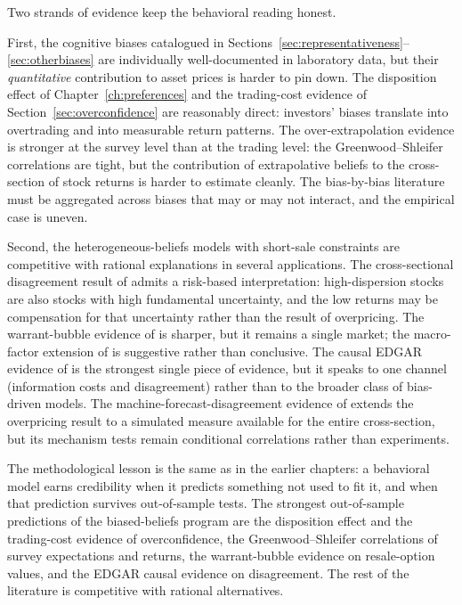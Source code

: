 Two strands of evidence keep the behavioral reading honest.

First, the cognitive biases catalogued in Sections~\ref{sec:representativeness}--\ref{sec:otherbiases} are individually well-documented in laboratory data, but their \emph{quantitative} contribution to asset prices is harder to pin down. The disposition effect of Chapter~\ref{ch:preferences} and the trading-cost evidence of Section~\ref{sec:overconfidence} are reasonably direct: investors' biases translate into overtrading and into measurable return patterns. The over-extrapolation evidence is stronger at the survey level than at the trading level: the Greenwood--Shleifer correlations are tight, but the contribution of extrapolative beliefs to the cross-section of stock returns is harder to estimate cleanly. The bias-by-bias literature must be aggregated across biases that may or may not interact, and the empirical case is uneven.

Second, the heterogeneous-beliefs models with short-sale constraints are competitive with rational explanations in several applications. The cross-sectional disagreement result of \citet{diether2003} admits a risk-based interpretation: high-dispersion stocks are also stocks with high fundamental uncertainty, and the low returns may be compensation for that uncertainty rather than the result of overpricing. The warrant-bubble evidence of \citet{xiong2011} is sharper, but it remains a single market; the macro-factor extension of \citet{li2016} is suggestive rather than conclusive. The causal EDGAR evidence of \citet{chang2022} is the strongest single piece of evidence, but it speaks to one channel (information costs and disagreement) rather than to the broader class of bias-driven models. The machine-forecast-disagreement evidence of \citet{bali2026} extends the overpricing result to a simulated measure available for the entire cross-section, but its mechanism tests remain conditional correlations rather than experiments.

The methodological lesson is the same as in the earlier chapters: a behavioral model earns credibility when it predicts something not used to fit it, and when that prediction survives out-of-sample tests. The strongest out-of-sample predictions of the biased-beliefs program are the disposition effect and the trading-cost evidence of overconfidence, the Greenwood--Shleifer correlations of survey expectations and returns, the warrant-bubble evidence on resale-option values, and the EDGAR causal evidence on disagreement. The rest of the literature is competitive with rational alternatives.

